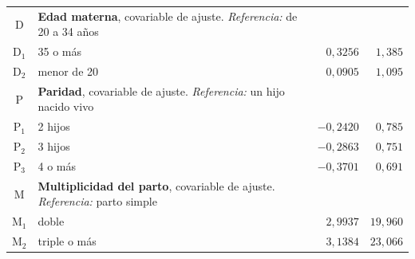 \begin{tabular}{@{}c p{} r r@{}}
$\mathrm{D}$ & \textbf{Edad materna}, covariable de ajuste. \textit{Referencia:} de 20 a 34 años &  &  \\
$\mathrm{D}_{1}$ & 35 o más & $0{,}3256$ & $1{,}385$ \\
$\mathrm{D}_{2}$ & menor de 20 & $0{,}0905$ & $1{,}095$ \\
\addlinespace
$\mathrm{P}$ & \textbf{Paridad}, covariable de ajuste. \textit{Referencia:} un hijo nacido vivo &  &  \\
$\mathrm{P}_{1}$ & 2 hijos & $-0{,}2420$ & $0{,}785$ \\
$\mathrm{P}_{2}$ & 3 hijos & $-0{,}2863$ & $0{,}751$ \\
$\mathrm{P}_{3}$ & 4 o más & $-0{,}3701$ & $0{,}691$ \\
\addlinespace
$\mathrm{M}$ & \textbf{Multiplicidad del parto}, covariable de ajuste. \textit{Referencia:} parto simple &  &  \\
$\mathrm{M}_{1}$ & doble & $2{,}9937$ & $19{,}960$ \\
$\mathrm{M}_{2}$ & triple o más & $3{,}1384$ & $23{,}066$ \\
\bottomrule
\end{tabular}
